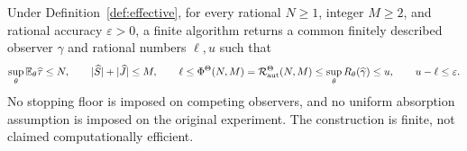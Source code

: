 \begin{theorem}\label{thm:effective-budget}
Under Definition~\ref{def:effective}, for every rational $N\ge1$, integer $M\ge2$, and rational accuracy $\varepsilon>0$, a finite algorithm returns a common finitely described observer $\widehat\gamma$ and rational numbers $\ell,u$ such that
\begin{equation}\label{eq:exact-budget-certificate}
 \sup_\theta\mathbb E_\theta\widehat\tau\le N,\qquad
 |\widehat S|+|\widehat J|\le M,\qquad
 \ell\le\Phi^\Theta(N,M)=\mathcal R_{\mathrm{aut}}^\Theta(N,M)
       \le\sup_\theta R_\theta(\widehat\gamma)\le u,
 \qquad u-\ell\le\varepsilon.
\end{equation}
No stopping floor is imposed on competing observers, and no uniform absorption assumption is imposed on the original experiment. The construction is finite, not claimed computationally efficient.
\end{theorem}
